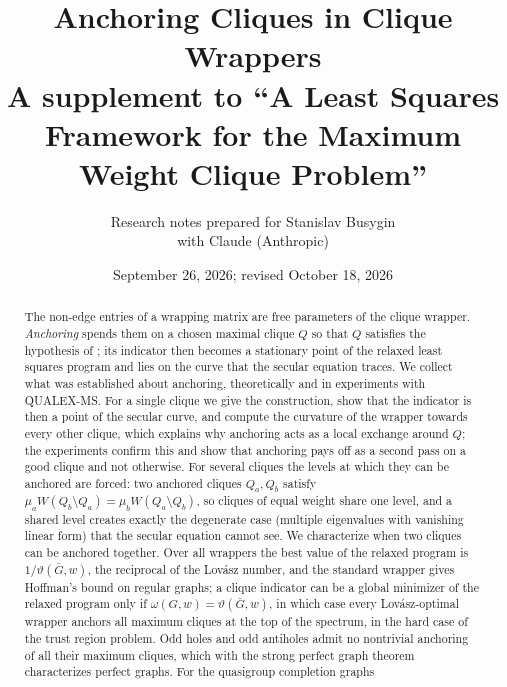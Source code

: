 \documentclass[11pt]{article}
\theoremstyle{definition}
\theoremstyle{remark}
\begin{document}
\title{Anchoring Cliques in Clique Wrappers\\[1ex]
{\large A supplement to ``A Least Squares Framework for the Maximum Weight
Clique Problem''}}

\author{Research notes prepared for Stanislav Busygin\\
with Claude (Anthropic)}

\date{September 26, 2026; revised October 18, 2026}

\maketitle

\begin{abstract}
The non-edge entries of a wrapping matrix are free parameters of the clique
wrapper. {\em Anchoring} spends them on a chosen maximal clique $Q$ so that
$Q$ satisfies the hypothesis of \cite[Theorem~2]{CW}; its indicator then
becomes a stationary point of the relaxed least squares program and lies on
the curve that the secular equation traces. We collect what was established
about anchoring, theoretically and in experiments with QUALEX-MS.
For a single clique we give the construction, show that
the indicator is then a point of the secular curve, and compute the curvature
of the wrapper towards every other clique, which explains why anchoring acts
as a local exchange around $Q$; the experiments confirm this and show that
anchoring pays off as a second pass on a good clique and not otherwise. For
several cliques the levels at which they can be anchored are forced: two
anchored cliques $Q_a,Q_b$ satisfy
$\mu_a W(Q_b\setminus Q_a)=\mu_b W(Q_a\setminus Q_b)$, so cliques of equal
weight share one level, and a shared level creates exactly the degenerate
case (multiple eigenvalues with vanishing linear form) that the secular
equation cannot see. We characterize when two cliques can be anchored
together. Over all wrappers the best value of the relaxed program is
$1/\vartheta(\bar G,w)$, the reciprocal of the Lov\'asz number, and the
standard wrapper gives Hoffman's bound on regular graphs; a clique indicator can be a global minimizer of the relaxed program only if
$\omega(G,w)=\vartheta(\bar G,w)$, in which case every Lov\'asz-optimal wrapper
anchors all maximum cliques at the top of the spectrum, in the hard case of
the trust region problem. Odd holes and odd antiholes admit no nontrivial
anchoring of all their maximum cliques, which with the strong perfect graph
theorem characterizes perfect graphs. For the quasigroup completion graphs

\end{abstract}
\end{document}

